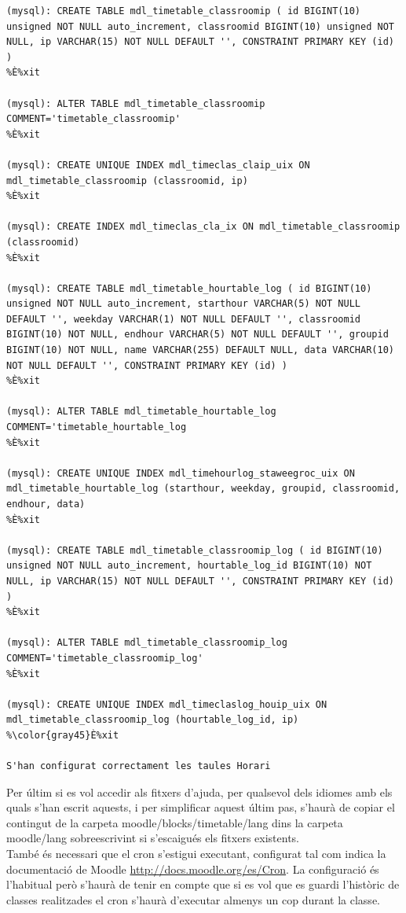 \documentclass[a4paper]{report}  %
\begin{document}
\begin{lstlisting}[style=SQL, caption=Resultat de la insta\l.lació del Block dins al sistema Moodle,escapechar=\%]
(mysql): CREATE TABLE mdl_timetable_classroomip ( id BIGINT(10) unsigned NOT NULL auto_increment, classroomid BIGINT(10) unsigned NOT NULL, ip VARCHAR(15) NOT NULL DEFAULT '', CONSTRAINT PRIMARY KEY (id) )
%È%xit

(mysql): ALTER TABLE mdl_timetable_classroomip COMMENT='timetable_classroomip'
%È%xit

(mysql): CREATE UNIQUE INDEX mdl_timeclas_claip_uix ON mdl_timetable_classroomip (classroomid, ip)
%È%xit

(mysql): CREATE INDEX mdl_timeclas_cla_ix ON mdl_timetable_classroomip (classroomid)
%È%xit

(mysql): CREATE TABLE mdl_timetable_hourtable_log ( id BIGINT(10) unsigned NOT NULL auto_increment, starthour VARCHAR(5) NOT NULL DEFAULT '', weekday VARCHAR(1) NOT NULL DEFAULT '', classroomid BIGINT(10) NOT NULL, endhour VARCHAR(5) NOT NULL DEFAULT '', groupid BIGINT(10) NOT NULL, name VARCHAR(255) DEFAULT NULL, data VARCHAR(10) NOT NULL DEFAULT '', CONSTRAINT PRIMARY KEY (id) )
%È%xit

(mysql): ALTER TABLE mdl_timetable_hourtable_log COMMENT='timetable_hourtable_log
%È%xit

(mysql): CREATE UNIQUE INDEX mdl_timehourlog_staweegroc_uix ON mdl_timetable_hourtable_log (starthour, weekday, groupid, classroomid, endhour, data)
%È%xit

(mysql): CREATE TABLE mdl_timetable_classroomip_log ( id BIGINT(10) unsigned NOT NULL auto_increment, hourtable_log_id BIGINT(10) NOT NULL, ip VARCHAR(15) NOT NULL DEFAULT '', CONSTRAINT PRIMARY KEY (id) )
%È%xit

(mysql): ALTER TABLE mdl_timetable_classroomip_log COMMENT='timetable_classroomip_log'
%È%xit

(mysql): CREATE UNIQUE INDEX mdl_timeclaslog_houip_uix ON mdl_timetable_classroomip_log (hourtable_log_id, ip)
%\color{gray45}È%xit

S'han configurat correctament les taules Horari
\end{lstlisting}
Per últim si es vol accedir als fitxers d'ajuda, per qualsevol dels idiomes amb els quals s'han escrit aquests, i per simplificar aquest últim pas, s'haurà de copiar el contingut de la carpeta moodle/blocks/timetable/lang dins la carpeta moodle/lang sobreescrivint si s'escaigués els fitxers existents.\\
També és necessari que el cron s'estigui executant, configurat tal com indica la documentació de Moodle \url{http://docs.moodle.org/es/Cron}. La configuració és l'habitual però s'haurà de tenir en compte que si es vol que es guardi l'històric de 	classes realitzades el cron s'haurà d'executar almenys un cop durant la classe.\\
\end{document}
